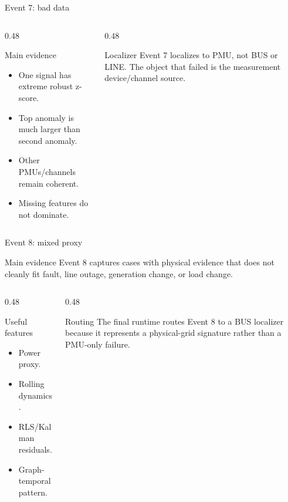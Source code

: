 \documentclass[10pt,aspectratio=169]{beamer}
\begin{document}
\begin{frame}{Event 7: bad data}
\small
\begin{columns}[T,totalwidth=\textwidth]
\begin{column}{0.48\textwidth}
\begin{block}{Main evidence}
\begin{itemize}
  \item One signal has extreme robust z-score.
  \item Top anomaly is much larger than second anomaly.
  \item Other PMUs/channels remain coherent.
  \item Missing features do not dominate.
\end{itemize}
\end{block}
\end{column}
\begin{column}{0.48\textwidth}
\begin{alertblock}{Localizer}
Event 7 localizes to PMU, not BUS or LINE. The object that failed is the measurement device/channel source.
\end{alertblock}
\end{column}
\end{columns}
\end{frame}

\begin{frame}{Event 8: mixed proxy}
\small
\begin{block}{Main evidence}
Event 8 captures cases with physical evidence that does not cleanly fit fault, line outage, generation change, or load change.
\end{block}
\begin{columns}[T,totalwidth=\textwidth]
\begin{column}{0.48\textwidth}
\begin{exampleblock}{Useful features}
\begin{itemize}
  \item Power proxy.
  \item Rolling dynamics.
  \item RLS/Kalman residuals.
  \item Graph-temporal pattern.
\end{itemize}
\end{exampleblock}
\end{column}
\begin{column}{0.48\textwidth}
\begin{alertblock}{Routing}
The final runtime routes Event 8 to a BUS localizer because it represents a physical-grid signature rather than a PMU-only failure.
\end{alertblock}
\end{column}
\end{columns}
\end{frame}
\end{document}
